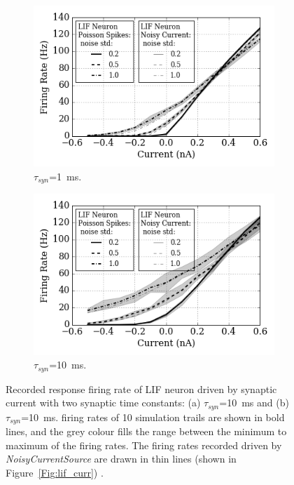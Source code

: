 	\begin{figure}[tbp!]
		\centering
		\begin{subfigure}[t]{0.49\textwidth}
			\includegraphics[width=\textwidth]{pics_iconip/spiked_curve_1.png}
			\caption{$\tau_{syn}$=1~ms.}
		\end{subfigure}
		\begin{subfigure}[t]{0.49\textwidth}
			\includegraphics[width=\textwidth]{pics_iconip/spiked_curve_10.png}
			\caption{$\tau_{syn}$=10~ms.}
		\end{subfigure}
		\caption{Recorded response firing rate of \DIFdelbeginFL {}\DIFdelendFL \DIFaddbeginFL {}\DIFaddendFL LIF neuron driven by \DIFaddbeginFL {}\DIFaddendFL synaptic current with two synaptic time constants: (a) $\tau_{syn}$=10~ms and (b) $\tau_{syn}$=10~ms. \DIFdelbeginFL {}\DIFdelendFL \DIFaddbeginFL {}\DIFaddendFL firing rates of 10 simulation trails are shown in bold lines, and the grey colour fills the range between the minimum to maximum of the firing rates. The firing rates recorded driven by \textit{NoisyCurrentSource} \DIFdelbeginFL \DIFdelFL{, }\DIFdelendFL are drawn in thin lines (shown in Figure~\ref{Fig:lif_curr}) \DIFdelbeginFL {}\DIFdelendFL \DIFaddbeginFL {}\DIFaddendFL .}
		\label{Fig:spike_curr}
	\end{figure}

